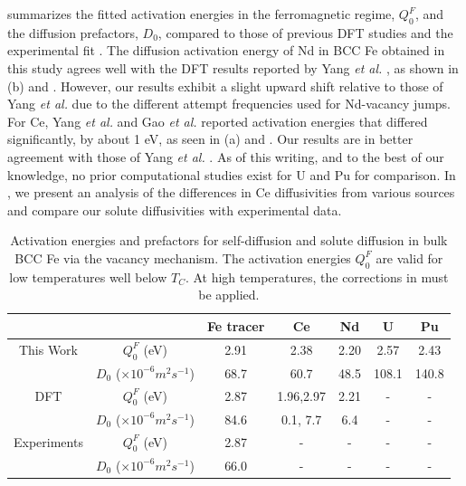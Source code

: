 \documentclass[preprint,12pt]{elsarticle}
\begin{document}
 summarizes the fitted activation energies in the ferromagnetic regime, $Q_0^F$, and the diffusion prefactors, $D_0$, compared to those of previous DFT studies \cite{yang_significant_2023,sandberg2015modeling, GAO2016316} and the experimental fit \cite{lubbehusen1990self}. 
The diffusion activation energy of Nd in BCC Fe obtained in this study agrees well with the DFT results reported by Yang \textit{et al.} \cite{yang_significant_2023}, as shown in (b) and . However, our results exhibit a slight upward shift relative to those of Yang \textit{et al.} due to the different attempt frequencies used for Nd-vacancy jumps. For Ce, Yang \textit{et al.} \cite{yang_significant_2023} and Gao \textit{et al.} \cite{GAO2016316} reported activation energies that differed significantly, by about 1 eV, as seen in (a) and . Our results are in better agreement with those of Yang \textit{et al.} \cite{yang_significant_2023}. 
As of this writing, and to the best of our knowledge, no prior computational studies exist for U and Pu for comparison. 
In , we present an analysis of the differences in Ce diffusivities from various sources and compare our solute diffusivities with experimental data.


\begin{table}[!ht]
    \centering
    \caption{Activation energies and prefactors for self-diffusion and solute diffusion in bulk BCC Fe via the vacancy mechanism. The activation energies $Q_0^F$ are valid for low temperatures well below $T_C$. At high temperatures, the corrections in  must be applied.}
    \label{tab:activation_energies}
    \begin{tabular}{|c|c|c|c|c|c|c|}
    \hline
         &&Fe tracer&Ce&Nd&U&Pu  \\
    \hline
    This Work& $Q_0^F$ (eV)&2.91&2.38&2.20&2.57&2.43 \\
                &  $D_0$ ($\times 10^{-6} m^2 s^{-1}$)
    &68.7&60.7&48.5&108.1&140.8\\
    \hline
    DFT&$Q_0^F$ (eV)
    & 2.87\cite{sandberg2015modeling} &1.96\cite{yang_significant_2023},2.97\cite{GAO2016316}
    &2.21\cite{yang_significant_2023}&-&-\\
                &$D_0$ ($\times 10^{-6} m^2 s^{-1}$)
    &84.6\cite{sandberg2015modeling}
    &0.1\cite{yang_significant_2023}, 7.7\cite{GAO2016316}
    &6.4\cite{yang_significant_2023}&-&-\\
    \hline
    Experiments &$Q_0^F$ (eV)& 2.87\cite{lubbehusen1990self}
    &-&-&-&- \\
                &  $D_0$ ($\times 10^{-6} m^2 s^{-1}$)& 66.0\cite{lubbehusen1990self} &-&-&-&- \\
    \hline
    \end{tabular}
\end{table}
\end{document}
